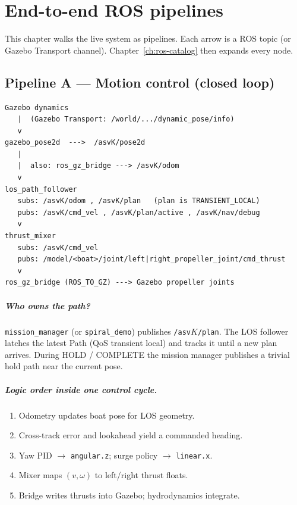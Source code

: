 \chapter{End-to-end ROS pipelines}
\label{ch:pipelines}

This chapter walks the live system as pipelines. Each arrow is a ROS topic
(or Gazebo Transport channel). Chapter~\ref{ch:ros-catalog} then expands every
node.

\section{Pipeline A --- Motion control (closed loop)}
\begin{verbatim}
Gazebo dynamics
   |  (Gazebo Transport: /world/.../dynamic_pose/info)
   v
gazebo_pose2d  --->  /asvK/pose2d
   |
   |  also: ros_gz_bridge ---> /asvK/odom
   v
los_path_follower
   subs: /asvK/odom , /asvK/plan   (plan is TRANSIENT_LOCAL)
   pubs: /asvK/cmd_vel , /asvK/plan/active , /asvK/nav/debug
   v
thrust_mixer
   subs: /asvK/cmd_vel
   pubs: /model/<boat>/joint/left|right_propeller_joint/cmd_thrust
   v
ros_gz_bridge (ROS_TO_GZ) ---> Gazebo propeller joints
\end{verbatim}

\paragraph{Who owns the path?}
\texttt{mission\_manager} (or \texttt{spiral\_demo}) publishes
\texttt{/asv\(K\)/plan}. The LOS follower latches the latest Path (QoS
transient local) and tracks it until a new plan arrives. During HOLD / COMPLETE
the mission manager publishes a trivial hold path near the current pose.

\paragraph{Logic order inside one control cycle.}
\begin{enumerate}[leftmargin=*]
  \item Odometry updates boat pose for LOS geometry.
  \item Cross-track error and lookahead yield a commanded heading.
  \item Yaw PID $\rightarrow$ \texttt{angular.z}; surge policy $\rightarrow$
        \texttt{linear.x}.
  \item Mixer maps \((v,\omega)\) to left/right thrust floats.
  \item Bridge writes thrusts into Gazebo; hydrodynamics integrate.
\end{enumerate}

